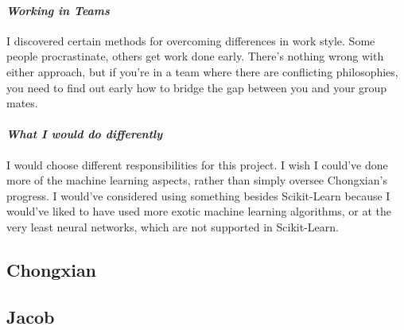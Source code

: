 \documentclass[onecolumn, draftclsnofoot,10pt, compsoc]{IEEEtran}
\begin{document}
\paragraph{\emph{Working in Teams}}
I discovered certain methods for overcoming differences in work style. Some people procrastinate, others get work done early. There's nothing wrong with either approach, but if you're in a team where there are conflicting philosophies, you need to find out early how to bridge the gap between you and your group mates.

\paragraph{\emph{What I would do differently}}
I would choose different responsibilities for this project. I wish I could've done more of the machine learning aspects, rather than simply oversee Chongxian's progress. I would've considered using something besides Scikit-Learn  because I would've liked to have used more exotic machine learning algorithms, or at the very least neural networks, which are not supported in Scikit-Learn.


\subsection{Chongxian}
\subsection{Jacob}

\appendices
\end{document}

